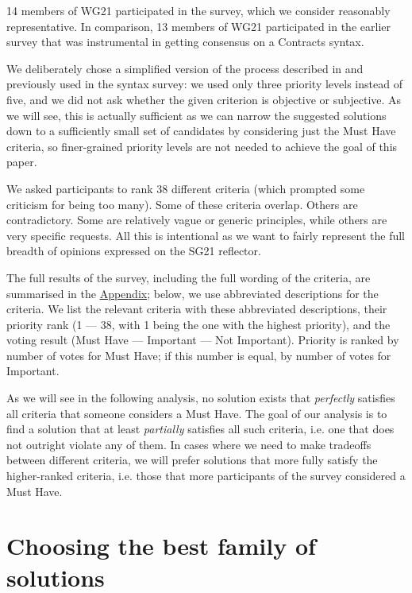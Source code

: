  14 members of WG21 participated in the survey, which we consider reasonably representative. In comparison, 13 members of WG21 participated in the earlier \cite{P2885R3} survey that was instrumental in getting consensus on a Contracts syntax.

We deliberately chose a simplified version of the process described in \cite{P3004R0} and previously used in the \cite{P2885R3} syntax survey: we used only three priority levels instead of five, and we did not ask whether the given criterion is objective or subjective. As we will see, this is actually sufficient as we can narrow the suggested solutions down to a sufficiently small set of candidates by considering just the Must Have criteria, so finer-grained priority levels are not needed to achieve the goal of this paper.

We asked participants to rank 38 different criteria (which prompted some criticism for being too many). Some of these criteria  overlap. Others are contradictory. Some are relatively vague or generic principles, while others are very specific requests. All this is intentional as we want to fairly represent the full breadth of opinions expressed on the SG21 reflector.

The full results of the survey, including the full wording of the criteria, are summarised in the \hyperref[sec:appendix]{Appendix}; below, we use abbreviated descriptions for the criteria. We list the relevant criteria with these abbreviated descriptions, their priority rank (1 --- 38, with 1 being the one with the highest priority), and the voting result (Must Have --- Important --- Not Important). Priority is ranked by number of votes for Must Have; if this number is equal, by number of votes for Important.

As we will see in the following analysis, no solution exists that \emph{perfectly} satisfies all criteria that someone considers a Must Have. The goal of our analysis is to find a solution that at least \emph{partially} satisfies all such criteria, i.e. one that does not outright violate any of them. In cases where we need to make tradeoffs between different criteria, we will prefer solutions that more fully satisfy the higher-ranked criteria, i.e. those that more participants of the survey considered a Must Have.


\section{Choosing the best family of solutions}
\label{sec:family}

